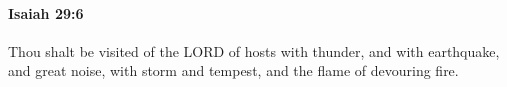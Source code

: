
		\paragraph{Isaiah 29:6} %
			\label{ISAIAH-29-6}

			Thou shalt be visited of the LORD of hosts with thunder, and with earthquake, and great noise, with storm and tempest, and the flame of devouring fire.


